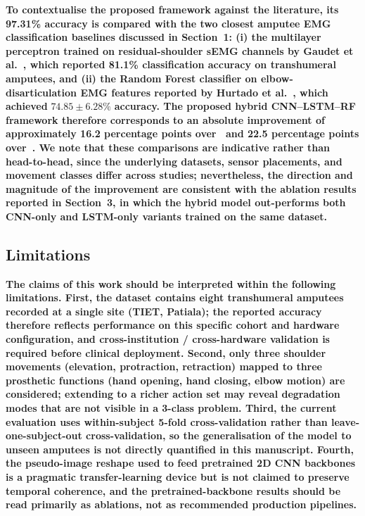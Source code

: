 \documentclass{elektr}
\newcommand{\yh}[1]{{\color{revhi}\textbf{#1}}}
\begin{document}
\yh{To contextualise the proposed framework against the literature, its 97.31\% accuracy is compared with the two closest amputee EMG classification baselines discussed in Section~1: (i) the multilayer perceptron trained on residual-shoulder sEMG channels by Gaudet et al.~\cite{gaudet2018classification}, which reported 81.1\% classification accuracy on transhumeral amputees, and (ii) the Random Forest classifier on elbow-disarticulation EMG features reported by Hurtado et al.~\cite{hurtado2024movements}, which achieved }$74.85 \pm 6.28\%$\yh{ accuracy. The proposed hybrid CNN--LSTM--RF framework therefore corresponds to an absolute improvement of approximately 16.2 percentage points over~\cite{gaudet2018classification} and 22.5 percentage points over~\cite{hurtado2024movements}. We note that these comparisons are indicative rather than head-to-head, since the underlying datasets, sensor placements, and movement classes differ across studies; nevertheless, the direction and magnitude of the improvement are consistent with the ablation results reported in Section~3, in which the hybrid model out-performs both CNN-only and LSTM-only variants trained on the same dataset.}

\subsection*{Limitations}
\yh{The claims of this work should be interpreted within the following limitations. First, the dataset contains eight transhumeral amputees recorded at a single site (TIET, Patiala); the reported accuracy therefore reflects performance on this specific cohort and hardware configuration, and cross-institution / cross-hardware validation is required before clinical deployment. Second, only three shoulder movements (elevation, protraction, retraction) mapped to three prosthetic functions (hand opening, hand closing, elbow motion) are considered; extending to a richer action set may reveal degradation modes that are not visible in a 3-class problem. Third, the current evaluation uses within-subject 5-fold cross-validation rather than leave-one-subject-out cross-validation, so the generalisation of the model to unseen amputees is not directly quantified in this manuscript. Fourth, the pseudo-image reshape used to feed pretrained 2D CNN backbones is a pragmatic transfer-learning device but is not claimed to preserve temporal coherence, and the pretrained-backbone results should be read primarily as ablations, not as recommended production pipelines.}
\end{document}
